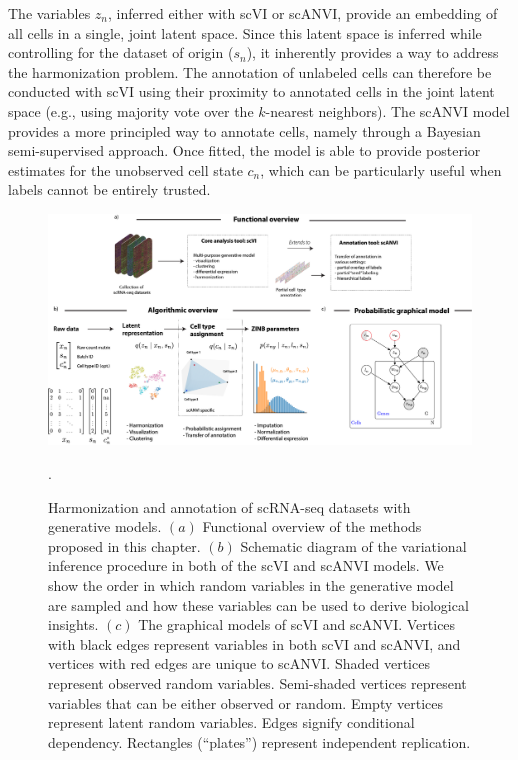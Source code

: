The variables $z_n$, inferred either with scVI or scANVI, provide an embedding of all cells in a single, joint latent space. Since this latent space is inferred while controlling for the dataset of origin ($s_n$), it inherently provides a way to address the harmonization problem. The annotation of unlabeled cells can therefore be conducted with scVI using their proximity to annotated cells in the joint latent space (e.g., using majority vote over the $k$-nearest neighbors). The scANVI model provides a more principled way to annotate cells, namely through a Bayesian semi-supervised approach. Once fitted, the model is able to provide posterior estimates for the unobserved cell state $c_n$, which can be particularly useful when labels cannot be entirely trusted. 


\begin{figure}
\centering
\includegraphics[width=\textwidth]{figures/Figure1.png}
\caption[Harmonization and annotation of scRNA-seq datasets with generative models]{Harmonization and annotation of scRNA-seq datasets with generative models. $(a)$ Functional overview of the methods proposed in this chapter. $(b)$ Schematic diagram of the variational inference procedure in both of the scVI and scANVI models. We show the order in which random variables in the generative model are sampled and how these variables can be used to derive biological insights. $(c)$ The graphical models of scVI and scANVI. Vertices with black edges represent variables in both scVI and scANVI, and vertices with red edges are unique to scANVI. Shaded vertices represent observed random variables. Semi-shaded vertices represent variables that can be either observed or random. Empty vertices represent latent random variables. Edges signify conditional dependency. Rectangles (``plates'') represent independent replication.}.
\label{scanviscanvi_presentation}
\end{figure}


